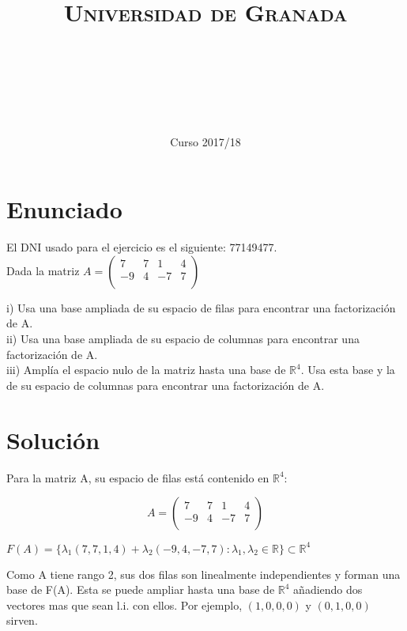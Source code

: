 \documentclass[11pt, a4paper]{article}
\title{
  \normalfont \normalsize 
  \textsc{Universidad de Granada} \\ [25pt]    %
  \horrule{0.5pt} \\[0.4cm] %
  \huge \sffamily\subject\\ %
  \horrule{2pt} \\[0.5cm] %
}
\author{\Large\sffamily{\docauthor}}
\date{\vspace{-1.5em} \normalsize \sffamily Curso 2017/18}
\newif\IfInSansMode
\newcommand{\R}{\mathbb{R}} \newcommand{\N}{\mathbb{N}}
\theoremstyle{theorem-style}
\theoremstyle{definition-style}
\theoremstyle{remark-style}
\theoremstyle{example-style}
\begin{document}
\maketitle  %
\vfill
\begin{center}
\end{center}
\newpage
\tableofcontents    %
\newpage



\section{Enunciado}
El DNI usado para el ejercicio es el siguiente: 77149477. \\

Dada la matriz 
$A = \begin{pmatrix}
7 & 7 & 1 & 4 \\
-9 & 4 & -7 & 7 \\
\end{pmatrix}$ 
	
i) Usa una base ampliada de su espacio de filas para encontrar una
factorización de A. \\
ii) Usa una base ampliada de su espacio de columnas para encontrar una factorización de A. \\
iii) Amplía el espacio nulo de la matriz hasta una base de $\R^4$. Usa esta base y la de su espacio de columnas para encontrar una factorización de A. \\

\section{Solución}

Para la matriz A, su espacio de filas está contenido en $\R^4$:

$$A = \begin{pmatrix}
7 & 7 & 1 & 4 \\
-9 & 4 & -7 & 7 \\
\end{pmatrix}$$ 

$F(A)= \{\lambda_1(7,7,1,4) + \lambda_2(-9,4,-7,7): \lambda_1,\lambda_2 \in \R \} \subset \R^4$ 

Como A tiene rango 2, sus dos filas son linealmente independientes y forman una base de F(A). Esta se puede ampliar hasta una base de $\R^4$ añadiendo dos vectores mas que sean l.i. con ellos. Por ejemplo, $(1,0,0,0)$ y $(0,1,0,0)$ sirven.
\end{document}

